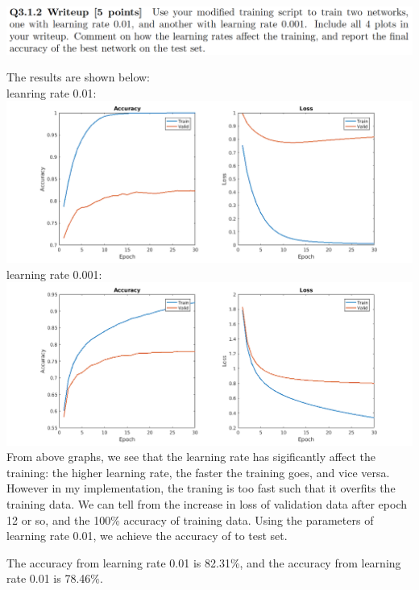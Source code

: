 \documentclass[12pt,letterpaper,boxed]{hmcpset}
\begin{document}
\begin{problem}[]
\includegraphics[width=\textwidth]{3_1_2.png}
\end{problem}

\begin{solution}
The results are shown below:\\
leanring rate 0.01:\\
\includegraphics[width=\textwidth]{3_1_2_1.png}\\
learning rate 0.001:\\
\includegraphics[width=\textwidth]{3_1_2_2.png}\\
From above graphs, we see that the learning rate has sigificantly affect the training: the higher
learning rate, the faster the training goes, and vice versa. However in my implementation, the traning is too fast such
that it overfits the training data. We can tell from the increase in loss of validation data after epoch 12 or so, 
and the 100\% accuracy of training data. Using the parameters of learning rate 0.01, we achieve the accuracy
of  to test set. 

The accuracy from learning rate 0.01 is 82.31\%, and the accuracy from learning rate 0.01 is 78.46\%.

\end{solution}
\newpage
\end{document}
